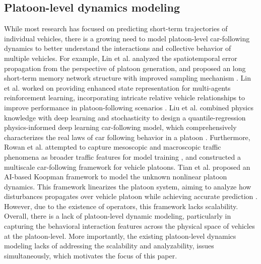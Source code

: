 \subsection{Platoon-level dynamics modeling}
While most research has focused on predicting short-term trajectories of individual vehicles, there is a growing need to model platoon-level car-following dynamics to better understand the interactions and collective behavior of multiple vehicles. For example, Lin et al. analyzed the spatiotemporal error propagation from the perspective of platoon generation, and proposed an long short-term memory network structure with improved sampling mechanism \citep{lin2020platoon}. Lin et al. worked on providing enhanced state representation for multi-agents reinforcement learning, incorporating intricate relative vehicle relationships to improve performance in platoon-following scenarios \citep{lin2024enhancing}. Liu et al. combined physics knowledge with deep learning and stochasticity to design a quantile-regression physics-informed deep learning car-following model, which comprehensively characterizes the real laws of car following behavior in a platoon \citep{liu2023quantile}. Furthermore, Rowan et al. attempted to capture mesoscopic and macroscopic traffic phenomena as broader traffic features for model training \citep{davies2024multiscale}, and constructed a multiscale car-following framework for vehicle platoons. Tian et al. proposed an AI-based Koopman framework to model the unknown nonlinear platoon dynamics. This framework linearizes the platoon system, aiming to analyze how disturbances propagates over vehicle platoon while achieving accurate prediction \citep{tian2024physically}. However, due to the existence of operators, this framework lacks scalability. Overall, there is a lack of platoon-level dynamic modeling, particularly in capturing the behavioral interaction features across the physical space of vehicles at the platoon-level. More importantly, the existing platoon-level dynamics modeling lacks of addressing the scalability and analyzability, issues simultaneously, which motivates the focus of this paper.